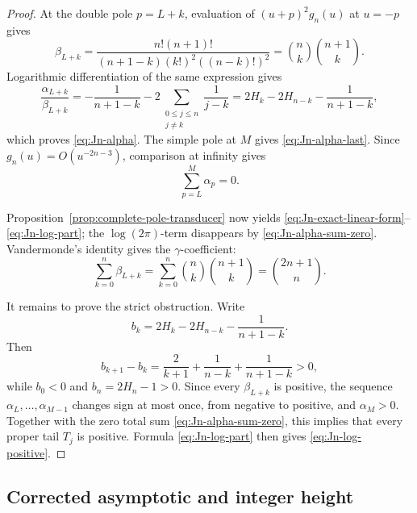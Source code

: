 \begin{proof}
At the double pole \(p=L+k\), evaluation of
\((u+p)^2g_n(u)\) at \(u=-p\) gives
\[
 \beta_{L+k}
 =\frac{n!(n+1)!}
 {(n+1-k)(k!)^2((n-k)!)^2}
 =\binom nk\binom{n+1}{k}.
\]
Logarithmic differentiation of the same expression gives
\[
 \frac{\alpha_{L+k}}{\beta_{L+k}}
 =-\frac1{n+1-k}
  -2\sum_{\substack{0\le j\le n\\j\ne k}}\frac1{j-k}
 =2H_k-2H_{n-k}-\frac1{n+1-k},
\]
which proves \eqref{eq:Jn-alpha}.  The simple pole at \(M\) gives
\eqref{eq:Jn-alpha-last}.  Since \(g_n(u)=O(u^{-2n-3})\), comparison at
infinity gives
\begin{equation}\label{eq:Jn-alpha-sum-zero}
 \sum_{p=L}^{M}\alpha_p=0.
\end{equation}

Proposition~\ref{prop:complete-pole-transducer} now yields
\eqref{eq:Jn-exact-linear-form}--\eqref{eq:Jn-log-part}; the
\(\log(2\pi)\)-term disappears by
\eqref{eq:Jn-alpha-sum-zero}.  Vandermonde's identity gives the
\(\gamma\)-coefficient:
\[
 \sum_{k=0}^n\beta_{L+k}
 =\sum_{k=0}^n\binom nk\binom{n+1}{k}
 =\binom{2n+1}{n}.
\]

It remains to prove the strict obstruction.  Write
\[
 b_k=2H_k-2H_{n-k}-\frac1{n+1-k}.
\]
Then
\[
 b_{k+1}-b_k
 =\frac2{k+1}+\frac1{n-k}+\frac1{n+1-k}>0,
\]
while \(b_0<0\) and \(b_n=2H_n-1>0\).  Since every
\(\beta_{L+k}\) is positive, the sequence
\(\alpha_L,\ldots,\alpha_{M-1}\) changes sign at most once, from negative
to positive, and \(\alpha_M>0\).  Together with the zero total sum
\eqref{eq:Jn-alpha-sum-zero}, this implies that every proper tail \(T_j\)
is positive.  Formula \eqref{eq:Jn-log-part} then gives
\eqref{eq:Jn-log-positive}.
\end{proof}

\subsection{Corrected asymptotic and integer height}

